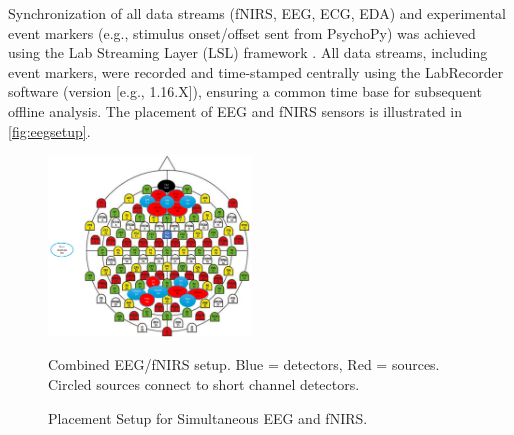 Synchronization of all data streams (\gls{fNIRS}, \gls{EEG}, \gls{ECG}, \gls{EDA}) and experimental event markers (e.g., stimulus onset/offset sent from PsychoPy) was achieved using the Lab Streaming Layer (LSL) framework \parencite{kotheLabStreamingLayerFramework2024}. All data streams, including event markers, were recorded and time-stamped centrally using the LabRecorder software (version [e.g., 1.16.X]), ensuring a common time base for subsequent offline analysis. The placement of \gls{EEG} and \gls{fNIRS} sensors is illustrated in \autoref{fig:eegsetup}.

\begin{figure}[htbp]
    \centering
    \includegraphics[width=0.48\textwidth]{../EV_images/EV_cogMeasSetupMod.png} %
    \caption{Placement Setup for Simultaneous \gls{EEG} and \gls{fNIRS}.}
    \label{fig:eegsetup} %
    \parbox{0.8\textwidth}{\scriptsize Combined \gls{EEG}/\gls{fNIRS} setup. Blue = detectors, Red = sources. Circled sources connect to short channel detectors.} %
\end{figure}


